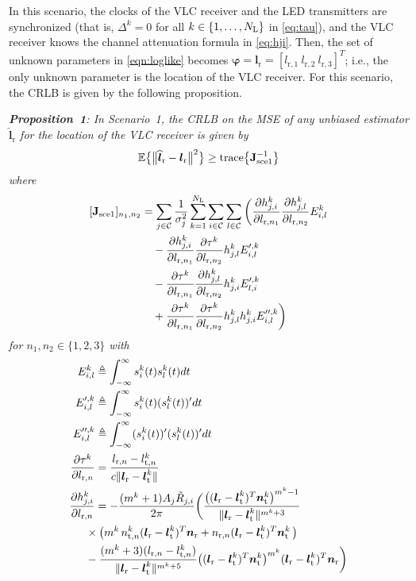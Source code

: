 \documentclass[10pt,twocolumn]{IEEEtran}
\newcommand{\NL}{N_{\rm{L}}}
\newcommand{\bvp}{{\boldsymbol{\varphi}}}
\newcommand{\mtC}{{\mathcal{C}}}
\newcommand{\expectation}{{\mathbb{E}}}
\DeclarePairedDelimiter{\norm}{\lVert}{\rVert}
\newcommand{\lr}{{\boldsymbol{l}_{\mathrm{r}}}}
\newcommand{\lrh}{{\widehat{\boldsymbol{l}}_{\mathrm{r}}}}
\newcommand{\lt}[1]{{\boldsymbol{l}^{#1}_{\mathrm{t}}}}
\newcommand{\nr}{{\boldsymbol{n}_{\mathrm{r}}}}
\newcommand{\nt}[1]{{\boldsymbol{n}^{#1}_{\mathrm{t}}}}
\newcommand{\lrs}[1]{{l_{\mathrm{r},#1}}}
\newcommand{\lts}[2]{{l^{#1}_{\mathrm{t},#2}}}
\newcommand{\nrs}[1]{{n_{\mathrm{r},#1}}}
\newcommand{\nts}[2]{{n^{#1}_{\mathrm{t},#2}}}
\newcommand{\Jsyni}{{\boldsymbol{\mathrm{J}}_{\mathrm{sce1}}^{-1}}}
\newcommand{\Jsyn}{{\boldsymbol{\mathrm{J}}_{\mathrm{sce1}}}}
\begin{document}
In this scenario, the clocks of the VLC receiver and the LED transmitters are synchronized (that is, $\Delta^k=0$ for all $k\in\{1,\ldots,\NL\}$ in \eqref{eq:tau}), and the VLC receiver knows the channel attenuation formula in \eqref{eq:hji}. Then, the set of unknown parameters in \eqref{eqn:loglike} becomes $\bvp=\lr=[\lrs{1}~\lrs{2}~\lrs{3}]^T$; i.e., the only unknown parameter is the location of the VLC receiver. For this scenario, the CRLB is given by the following proposition.

\textit{\textbf{Proposition~1}: In Scenario~1, the CRLB on the MSE of any unbiased estimator $\lrh$ for the location of the VLC receiver is given by}
\begin{gather}\label{eq:CRLBsync}
\expectation \big\{ \big\|\lrh - \lr \big\|^2 \big\}\geq\rm{trace}\big\{\Jsyni\big\}
\end{gather}
\textit{where}
\begin{align}\nonumber
[\Jsyn]_{n_1,n_2}&=\sum_{j\in\mtC}\frac{1}{\sigma_j^2}\sum_{k=1}^{\NL}\sum_{i\in\mtC}
\sum_{l\in\mtC}
\bigg(
\frac{\partial h^k_{j,i}}{\partial \lrs{n_1}}\frac{\partial h^k_{j,l}}{\partial \lrs{n_2}}E^k_{i,l}\\\nonumber
&\quad-\frac{\partial h^k_{j,i}}{\partial \lrs{n_1}}\frac{\partial \tau^k}{\partial \lrs{n_2}}h^k_{j,l}E'^{,k}_{i,l}\\\nonumber
&\quad-\frac{\partial \tau^k}{\partial \lrs{n_1}}\frac{\partial h^k_{j,l}}{\partial \lrs{n_2}}h^k_{j,i}E'^{,k}_{l,i}\\
&\quad+\frac{\partial \tau^k}{\partial \lrs{n_1}}\frac{\partial \tau^k}{\partial \lrs{n_2}}h^k_{j,l}h^k_{j,i}E''^{,k}_{i,l}
\bigg)\label{eq:Jsyc1}
\end{align}
\textit{for $n_1,n_2\in\{1,2,3\}$ with}
\begin{align}\label{eq:Eilpos}
E^k_{i,l}&\triangleq\int_{-\infty}^{\infty}s^k_i(t)s^k_l(t)dt\\\label{eq:Eil1pos}
E'^{,k}_{i,l}&\triangleq\int_{-\infty}^{\infty}s^k_i(t)(s^k_l(t))'dt\\\label{eq:Eil2pos}
E''^{,k}_{i,l}&\triangleq\int_{-\infty}^{\infty}(s^k_i(t))'(s^k_l(t))'dt
\\\label{eq:tauDer}
\frac{\partial \tau^k}{\partial \lrs{n}}&=\frac{\lrs{n}-\lts{k}{n}}{c\norm{\lr - \lt{k}}}
\\\label{eq:alpDer}
\frac{\partial h^k_{j,i}}{\partial \lrs{n}}&=-\frac{(m^k+1)A_j\tilde{R}_{j,i}}{2\pi}\bigg(
\frac{\big((\lr - \lt{k})^T\nt{k}\big)^{m^k-1}}{\norm{\lr - \lt{k}}^{m^k+3}}
\\\nonumber
&\hspace{-0.3cm}\times\big(m^k\,\nts{k}{n}(\lr - \lt{k})^T\nr
+\nrs{n}(\lr - \lt{k})^T\nt{k}\,\big)
\\\nonumber
&\hspace{-0.3cm}-\frac{(m^k+3)(\lrs{n}-\lts{k}{n})}{\norm{\lr - \lt{k}}^{m^k+5}}\big((\lr - \lt{k})^T\nt{k}\big)^{m^k}(\lr - \lt{k})^T\nr\bigg)
\end{align}
\end{document}
